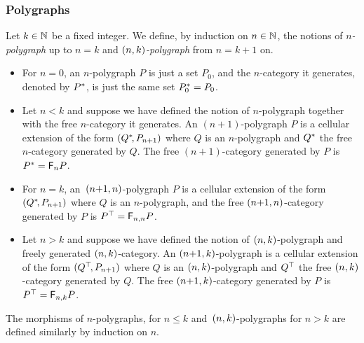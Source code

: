 \subsubsection{Polygraphs}\label{ssubsec:polyg}
Let $k\in\mathbb N$ be a fixed integer. We define, by induction on $n\in\mathbb N$,
the notions of {\em $n$-polygraph} up to $n=k$ and {\em
  $(n,k)$-polygraph} from $n=k{+}1$ on.
\begin{itemize}
\item For $n=0$, an
$n$-polygraph $P$ is just a set $P_0$, and the $n$-category it
generates, denoted by $P^*$, is just the same set $P^*_0=P_0$.
\item Let $n<k$ and suppose we have defined the notion of
  $n$-polygraph together with the free $n$-category it
  generates. An $(n{+}1)$-polygraph $P$ is a cellular extension of the
  form $(Q^*\!,P_{n+1})$ where $Q$ is an $n$-polygraph and
  $Q^*$ the free $n$-category generated by $Q$. The free
  $(n{+}1)$-category generated by $P$ is $P^*=\mathsf{F}_{n}P$.
\item For $n=k$, an~$(n{+}1,n)$-polygraph $P$ is a cellular
  extension of the form $(Q^*\!,P_{n+1})$ where $Q$ is an
  $n$-polygraph, and the free $(n{+}1,n)$-category generated by
  $P$ is $P^\top=\mathsf{F}_{n,n}P$.
  \item Let $n>k$ and suppose we have defined the notion of $(n,k)$-polygraph and freely generated $(n,k)$-category. An
    $(n{+}1,k)$-polygraph is a cellular extension  of the form
    $(Q^\top\!,P_{n+1})$ where $Q$ is an $(n,k)$-polygraph and
    $Q^\top$ the free $(n,k)$-category generated by $Q$. The free
    $(n{+}1,k)$-category generated by $P$ is $P^\top=\mathsf{F}_{n,k}
    P$.
 \end{itemize}   
The morphisms of $n$-polygraphs, for $n\leq k$ and~$(n,k)$-polygraphs for $n>k$ are defined similarly by
induction on $n$. 
